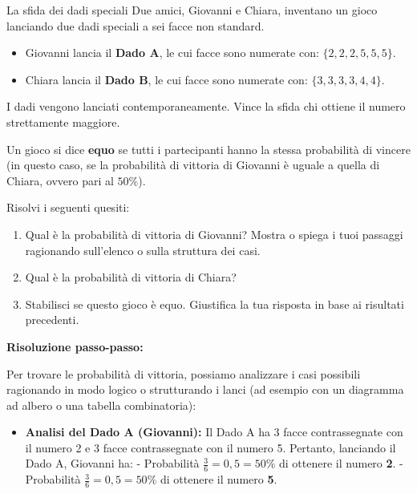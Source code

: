\begin{esercizio}{La sfida dei dadi speciali}
Due amici, Giovanni e Chiara, inventano un gioco lanciando due dadi speciali a sei facce non standard.
\begin{itemize}
  \item Giovanni lancia il \textbf{Dado A}, le cui facce sono numerate con: $\{2, 2, 2, 5, 5, 5\}$.
  \item Chiara lancia il \textbf{Dado B}, le cui facce sono numerate con: $\{3, 3, 3, 3, 4, 4\}$.
\end{itemize}
I dadi vengono lanciati contemporaneamente. Vince la sfida chi ottiene il numero strettamente maggiore.

\begin{reminder}
  Un gioco si dice \textbf{equo} se tutti i partecipanti hanno la stessa probabilità di vincere (in questo caso, se la probabilità di vittoria di Giovanni è uguale a quella di Chiara, ovvero pari al $50\%$).
\end{reminder}

Risolvi i seguenti quesiti:

\begin{enumerate}[label=\alph*)]
  \item Qual è la probabilità di vittoria di Giovanni? Mostra o spiega i tuoi passaggi ragionando sull'elenco o sulla struttura dei casi.
  \item Qual è la probabilità di vittoria di Chiara?
  \item Stabilisci se questo gioco è equo. Giustifica la tua risposta in base ai risultati precedenti.
\end{enumerate}

\responsespace{3.8cm}

\begin{soluzione}
  \textbf{Risoluzione passo-passo:}
  
  Per trovare le probabilità di vittoria, possiamo analizzare i casi possibili ragionando in modo logico o strutturando i lanci (ad esempio con un diagramma ad albero o una tabella combinatoria):
  
  \begin{itemize}
    \item \textbf{Analisi del Dado A (Giovanni):} 
    Il Dado A ha 3 facce contrassegnate con il numero 2 e 3 facce contrassegnate con il numero 5.
    Pertanto, lanciando il Dado A, Giovanni ha:
    - Probabilità $\frac{3}{6} = 0{,}5 = 50\%$ di ottenere il numero \textbf{2}.
    - Probabilità $\frac{3}{6} = 0{,}5 = 50\%$ di ottenere il numero \textbf{5}.
    

\end{itemize}
\end{soluzione}
\end{esercizio}
